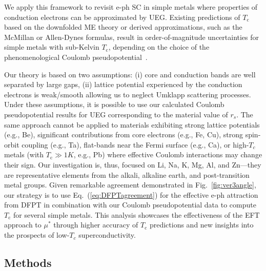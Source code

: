 \documentclass[%
 reprint,
superscriptaddress,
 amsmath,amssymb,
 aps,
prx,
]{revtex4-2}
\newcommand{\comment}[1]{\textcolor{teal}{#1}}
\newcommand{\txc}{\text{c}}
\begin{document}

We apply this framework to revisit e-ph SC in simple metals where properties of conduction electrons can be approximated by UEG. Existing predictions of $T_\txc$ based on the downfolded ME theory or derived approximations, such as the McMillan or Allen-Dynes formulas, result in order-of-magnitude uncertainties for simple metals with sub-Kelvin $T_\txc$, depending on the choice of the phenomenological Coulomb pseudopotential~\cite{morel_anderson}.

Our theory is based on two assumptions:
(i) core and conduction bands are well separated by large gaps,
(ii) lattice potential experienced by the conduction electrons is weak/smooth allowing us to neglect Umklapp scattering processes.
Under these assumptions, it is possible to use our calculated Coulomb pseudopotential results for UEG corresponding to the material value of $r_s$. The same approach cannot be applied to materials exhibiting strong lattice potentials (e.g., Be), significant contributions from core electrons (e.g., Fe, Cu), strong spin-orbit coupling (e.g., Ta), flat-bands near the Fermi surface (e.g., Ca), or high-$T_c$ metals (with $T_\txc \gg 1 K$, e.g., Pb) where effective Coulomb interactions may change their sign.
Our investigation is, thus, focused on Li, Na, K, Mg, Al, and Zn---they are representative elements from the alkali, alkaline earth, and post-transition metal groups. Given remarkable agreement demonstrated in Fig.~\ref{fig:ver3angle}, our strategy is to use Eq.~(\ref{eq:DFPTagreement}) for the effective e-ph attraction from DFPT in combination with our Coulomb pseudopotential data to compute $T_\txc$ for several simple metals. This analysis showcases the effectiveness of the EFT approach to $\mu^*$ through higher accuracy of $T_\txc$ predictions and new insights into the prospects of low-$T_c$ superconductivity.


\subsection{Methods}
\end{document}
